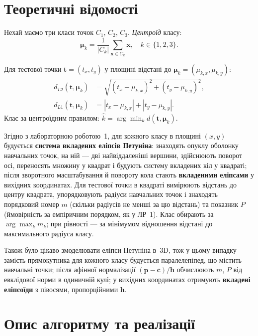 \documentclass[14pt,a4paper,oneside]{extarticle}
\begin{document}
\section{Теоретичні відомості}

Нехай маємо три класи точок $C_1$, $C_2$, $C_3$. \emph{Центроїд} класу:
\begin{equation}
  \boldsymbol{\mu}_k = \frac{1}{|C_k|} \sum_{\mathbf{x} \in C_k} \mathbf{x}, \quad k \in \{1,2,3\}.
\end{equation}

Для тестової точки $\mathbf{t}=(t_x,t_y)$ у площині відстані до $\boldsymbol{\mu}_k=(\mu_{k,x},\mu_{k,y})$:
\begin{align}
  d_{L2}(\mathbf{t},\boldsymbol{\mu}_k) &= \sqrt{(t_x-\mu_{k,x})^2 + (t_y-\mu_{k,y})^2}, \\
  d_{L1}(\mathbf{t},\boldsymbol{\mu}_k) &= |t_x-\mu_{k,x}| + |t_y-\mu_{k,y}|.
\end{align}
Клас за центроїдним правилом: $\hat{k} = \arg\min_k d(\mathbf{t},\boldsymbol{\mu}_k)$.

Згідно з лабораторною роботою~1, для кожного класу в площині $(x,y)$ будується \textbf{система вкладених еліпсів Петуніна}: знаходять опуклу оболонку навчальних точок, на ній --- дві найвіддаленіші вершини, здійснюють поворот осі, переносять множину у квадрат і будують систему вкладених кіл у квадраті; після зворотного масштабування й повороту кола стають \textbf{вкладеними еліпсами} у вихідних координатах.
Для тестової точки в квадраті вимірюють відстань до центру квадрата, упорядковують радіуси навчальних точок і знаходять порядковий номер $m$ (скільки радіусів не менші за цю відстань) та показник $P$ (ймовірність за емпіричним порядком, як у ЛР~1).
Клас обирають за $\arg\max_k m_k$; при рівності --- за мінімумом відношення відстані до максимального радіуса класу.

Також було цікаво змоделювати еліпси Петуніна в~3D, тож у цьому випадку замість прямокутника для кожного класу будується паралелепіпед, що містить навчальні точки; після афінної нормалізації $(\mathbf{p}-\mathbf{c})/\mathbf{h}$ обчислюють $m$, $P$ від евклідової норми в одиничній кулі; у вихідних координатах отримують \textbf{вкладені еліпсоїди} з півосями, пропорційними $\mathbf{h}$.

\section{Опис алгоритму та реалізації}
\end{document}
